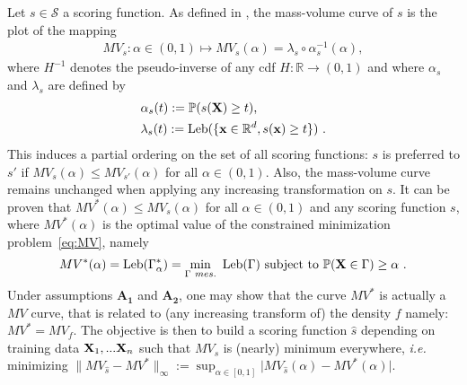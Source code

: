 Let $s\in \mathcal{S}$ a scoring function. As defined in \cite{CLEM13,CLEM14}, the mass-volume curve of $s$ is the plot of the mapping 
\begin{align*}
MV_s : \alpha\in (0,1)\mapsto MV_s(\alpha) = \lambda_s \circ \alpha_s^{-1}(\alpha),
\end{align*}
where $H^{-1}$ denotes the pseudo-inverse of any cdf $H:\mathbb{R}\rightarrow (0,1)$ and where $\alpha_s$ and $\lambda_s$ are defined by
\begin{equation}
\begin{aligned}
\label{eq:alpha_beta}
&\alpha_s(t):= \mathbb{P}(s(\mathbf X) \ge t), \\
&\lambda_s(t):=\text{Leb}(\{\mathbf x \in \mathbb{R}^d, s(\mathbf x) \ge t\})~.
\end{aligned}
\end{equation}
%
This induces a partial ordering on the set of all scoring functions: $s$ is
preferred to $s'$ if $MV_{s}(\alpha) \le MV_{s'}(\alpha)$ for all
$\alpha\in(0,1)$. Also, the mass-volume curve remains unchanged when applying any increasing transformation on $s$.
It can be proven that $MV^*(\alpha)\leq MV_s(\alpha)$ for all $\alpha\in (0,1)$ and any scoring function $s$, where $MV^*(\alpha)$ is the optimal value of the constrained minimization problem~\eqref{eq:MV}, namely
%
\begin{align}
\label{def:MV}
MV^*(\alpha)= \text{Leb}(\Gamma_\alpha^*)=\min_{\Gamma~ mes.} ~\text{Leb}(\Gamma) \mbox{~subject to~} \mathbb{P}(\mathbf X \in \Gamma) \ge \alpha~.
\end{align}
%
Under assumptions $\mathbf{A_1}$ and $\mathbf{A_2}$, one may show that the curve $MV^*$ is actually a $MV$ curve, that is related to (any increasing transform of) the density $f$ namely: $MV^*=MV_f$. 
The objective is then to build a scoring function $\hat s$ depending on training data $\mathbf X_1,...\mathbf X_n$ such that $MV_{\hat s}$ is (nearly) minimum everywhere, \textit{i.e.} minimizing $\|MV_{\hat s}-MV^*\|_{\infty}:=\sup_{\alpha\in[0,1]}\vert MV_{\hat s}(\alpha)-MV^*(\alpha)\vert$.

